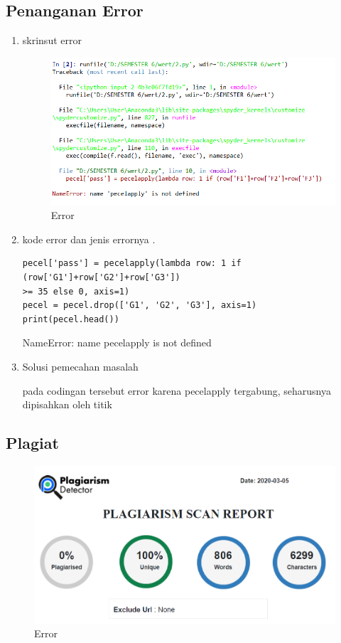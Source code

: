 \subsection{Penanganan Error}
\begin{enumerate}
\item skrinsut error
\begin{figure}[ht]
\centering
\includegraphics[scale=0.5]{figures/1174050/chapter2/error.PNG}
\caption{Error}
\label{contoh}
\end{figure}

\item kode error dan jenis errornya .
\begin{verbatim}
pecel['pass'] = pecelapply(lambda row: 1 if (row['G1']+row['G2']+row['G3'])
>= 35 else 0, axis=1)
pecel = pecel.drop(['G1', 'G2', 'G3'], axis=1)
print(pecel.head())
\end{verbatim}

NameError: name pecelapply is not defined

\item Solusi pemecahan masalah \par
pada codingan tersebut error karena pecelapply tergabung, seharusnya dipisahkan oleh titik
\end{enumerate}


\subsection{Plagiat}
\begin{figure}[ht]
\centering
\includegraphics[scale=0.5]{figures/1174050/chapter2/plagiarism.PNG}
\caption{Error}
\label{contoh}
\end{figure}
